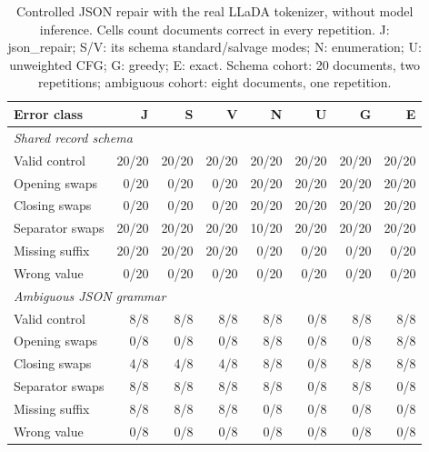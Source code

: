 \begin{table}[ht]
\centering\small
\caption{Controlled JSON repair with the real LLaDA tokenizer, without model inference. Cells count documents correct in every repetition. J: json\_repair; S/V: its schema standard/salvage modes; N: enumeration; U: unweighted CFG; G: greedy; E: exact. Schema cohort: 20 documents, two repetitions; ambiguous cohort: eight documents, one repetition.}
\label{tab:repair}
\begin{tabular}{lrrrrrrr}\toprule
Error class & J & S & V & N & U & G & E\\\midrule
\multicolumn{8}{l}{\emph{Shared record schema}}\\
Valid control & 20/20 & 20/20 & 20/20 & 20/20 & 20/20 & 20/20 & 20/20 \\
Opening swaps & 0/20 & 0/20 & 0/20 & 20/20 & 20/20 & 20/20 & 20/20 \\
Closing swaps & 0/20 & 0/20 & 0/20 & 20/20 & 20/20 & 20/20 & 20/20 \\
Separator swaps & 20/20 & 20/20 & 20/20 & 10/20 & 20/20 & 20/20 & 20/20 \\
Missing suffix & 20/20 & 20/20 & 20/20 & 0/20 & 0/20 & 0/20 & 0/20 \\
Wrong value & 0/20 & 0/20 & 0/20 & 0/20 & 0/20 & 0/20 & 0/20 \\
\midrule
\multicolumn{8}{l}{\emph{Ambiguous JSON grammar}}\\
Valid control & 8/8 & 8/8 & 8/8 & 8/8 & 0/8 & 8/8 & 8/8 \\
Opening swaps & 0/8 & 0/8 & 0/8 & 8/8 & 0/8 & 0/8 & 8/8 \\
Closing swaps & 4/8 & 4/8 & 4/8 & 8/8 & 0/8 & 8/8 & 8/8 \\
Separator swaps & 8/8 & 8/8 & 8/8 & 8/8 & 0/8 & 8/8 & 0/8 \\
Missing suffix & 8/8 & 8/8 & 8/8 & 0/8 & 0/8 & 0/8 & 0/8 \\
Wrong value & 0/8 & 0/8 & 0/8 & 0/8 & 0/8 & 0/8 & 0/8 \\
\bottomrule
\end{tabular}
\end{table}
